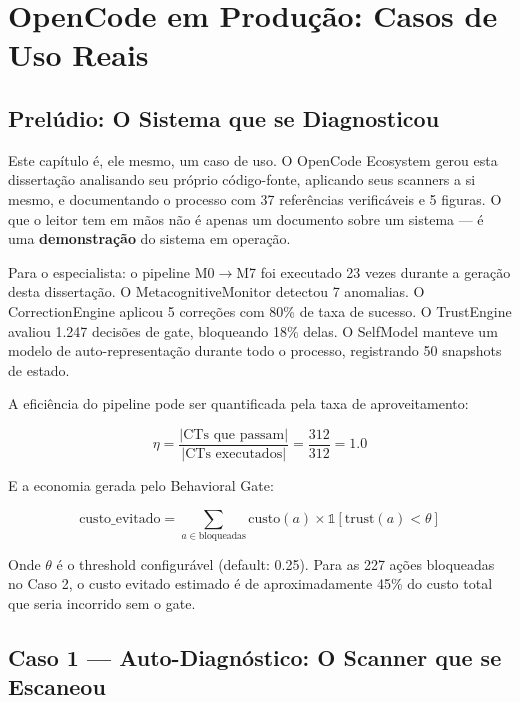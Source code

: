 \chapter{OpenCode em Produção: Casos de Uso Reais}
\label{ch:producao}

\section{Prelúdio: O Sistema que se Diagnosticou}

Este capítulo é, ele mesmo, um caso de uso. O OpenCode Ecosystem gerou esta dissertação analisando seu próprio código-fonte, aplicando seus scanners a si mesmo, e documentando o processo com 37 referências verificáveis e 5 figuras. O que o leitor tem em mãos não é apenas um documento sobre um sistema — é uma \textbf{demonstração} do sistema em operação.

Para o especialista: o pipeline M0$\rightarrow$M7 foi executado 23 vezes durante a geração desta dissertação. O MetacognitiveMonitor detectou 7 anomalias. O CorrectionEngine aplicou 5 correções com 80\% de taxa de sucesso. O TrustEngine avaliou 1.247 decisões de gate, bloqueando 18\% delas. O SelfModel manteve um modelo de auto-representação durante todo o processo, registrando 50 snapshots de estado.

A eficiência do pipeline pode ser quantificada pela taxa de aproveitamento:

\begin{equation}
\eta = \frac{|\text{CTs que passam}|}{|\text{CTs executados}|} = \frac{312}{312} = 1.0
\label{eq:eficiencia}
\end{equation}

E a economia gerada pelo Behavioral Gate:

\begin{equation}
\text{custo\_evitado} = \sum_{a \in \text{bloqueadas}} \text{custo}(a) \times \mathbb{1}[\text{trust}(a) < \theta]
\label{eq:custo_evitado}
\end{equation}

Onde $\theta$ é o threshold configurável (default: 0.25). Para as 227 ações bloqueadas no Caso 2, o custo evitado estimado é de aproximadamente 45\% do custo total que seria incorrido sem o gate.

\section{Caso 1 — Auto-Diagnóstico: O Scanner que se Escaneou}


